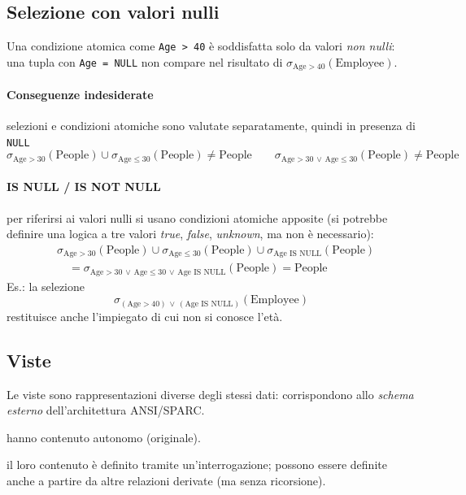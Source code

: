 \documentclass[a4paper,12pt]{article}
\begin{document}
\subsection{Selezione con valori nulli}

Una condizione atomica come \texttt{Age > 40} è soddisfatta solo da valori
\emph{non nulli}: una tupla con \texttt{Age = NULL} non compare nel risultato di
$\sigma_{\text{Age} > 40}(\text{Employee})$.

\paragraph{Conseguenze indesiderate} selezioni e condizioni atomiche sono
valutate separatamente, quindi in presenza di \texttt{NULL}
\[
  \sigma_{\text{Age} > 30}(\text{People}) \cup
  \sigma_{\text{Age} \leq 30}(\text{People}) \neq \text{People}
  \qquad
  \sigma_{\text{Age} > 30 \,\vee\, \text{Age} \leq 30}(\text{People})
  \neq \text{People}
\]

\paragraph{IS NULL / IS NOT NULL} per riferirsi ai valori nulli si usano
condizioni atomiche apposite (si potrebbe definire una logica a tre valori
\emph{true}, \emph{false}, \emph{unknown}, ma non è necessario):
\begin{align*}
  & \sigma_{\text{Age} > 30}(\text{People}) \cup
    \sigma_{\text{Age} \leq 30}(\text{People}) \cup
    \sigma_{\text{Age IS NULL}}(\text{People})\\
  & \quad = \sigma_{\text{Age} > 30 \,\vee\, \text{Age} \leq 30 \,\vee\,
    \text{Age IS NULL}}(\text{People}) = \text{People}
\end{align*}
Es.: la selezione
\[
  \sigma_{(\text{Age} > 40) \,\vee\, (\text{Age IS NULL})}(\text{Employee})
\]
restituisce anche l'impiegato di cui non si conosce l'età.

\subsection{Viste}

Le viste sono rappresentazioni diverse degli stessi dati: corrispondono allo
\emph{schema esterno} dell'architettura ANSI/SPARC.
\begin{description}[style=nextline]
  \item[Relazioni di base] hanno contenuto autonomo (originale).
  \item[Relazioni derivate] il loro contenuto è definito tramite
    un'interrogazione; possono essere definite anche a partire da altre
    relazioni derivate (ma senza ricorsione).
\end{description}
\end{document}
